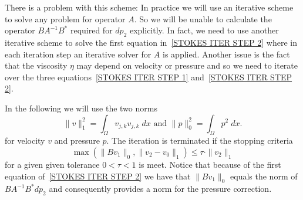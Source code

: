There is a problem with this scheme: In practice we will use an iterative scheme
to solve any problem for operator $A$. So we will be unable to calculate the operator
$ B A^{-1} B^{*}$ required for $dp_{2}$ explicitly. In fact, we need to use another
iterative scheme to solve the first equation in~\ref{STOKES ITER STEP 2} where in each iteration step
an iterative solver for $A$ is applied. Another issue is the fact that the
viscosity $\eta$ may depend on velocity or pressure and so we need to iterate over the 
three equations~\ref{STOKES ITER STEP 1} and~\ref{STOKES ITER STEP 2}. 

In the following we will use the two norms
\begin{equation}
\|v\|_{1}^2 = \int_{\Omega} v_{j,k}v_{j,k} \; dx 
\mbox{ and }
\|p\|_{0}^2= \int_{\Omega} p^2 \; dx.
\label{STOKES STOP}
\end{equation}
for velocity $v$ and pressure $p$. The iteration is terminated if the stopping criteria
 \begin{equation} \label{STOKES STOPPING CRITERIA}
\max(\|Bv_{1}\|_{0},\|v_{2}-v_{0}\|_{1}) \le \tau \cdot \|v_{2}\|_{1} 
 \end{equation}
 for a given  given tolerance $0<\tau<1$ is meet. Notice that because of the first equation of~\ref{STOKES ITER STEP 2} we have that
$\|Bv_{1}\|_{0}$ equals the
norm of $B A^{-1} B^{*} dp_{2}$ and consequently provides a norm for the pressure correction.

